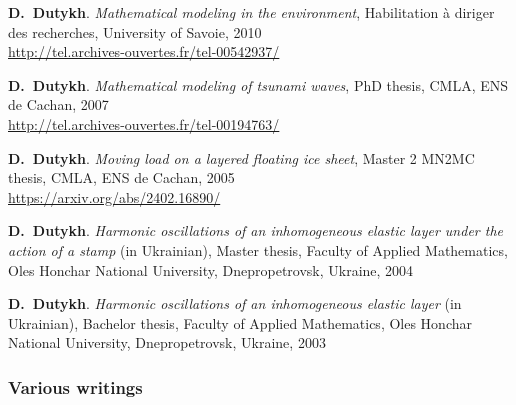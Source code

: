 \documentclass[final, a4paper, oneside, 12pt]{article}
\numberwithin{equation}{section}
\begin{document}
\begin{etaremune}
  
  \item \textbf{D.~Dutykh}. \textit{Mathematical modeling in the environment}, Habilitation \`a diriger des recherches, University of Savoie, 2010 \\ %
  \url{http://tel.archives-ouvertes.fr/tel-00542937/}
  
  \item \textbf{D.~Dutykh}. \textit{Mathematical modeling of tsunami waves}, PhD thesis, CMLA, ENS de Cachan, 2007 \\ %
  \url{http://tel.archives-ouvertes.fr/tel-00194763/}
  
  \item \textbf{D.~Dutykh}. \textit{Moving load on a layered floating ice sheet}, Master 2 MN2MC thesis, CMLA, ENS de Cachan, 2005 \\ %
  \url{https://arxiv.org/abs/2402.16890/}
  
  \item \textbf{D.~Dutykh}. \textit{Harmonic oscillations of an inhomogeneous elastic layer under the action of a stamp} (in Ukrainian), Master thesis, Faculty of Applied Mathematics, Oles Honchar National University, Dnepropetrovsk, Ukraine, 2004 %

  \item \textbf{D.~Dutykh}. \textit{Harmonic oscillations of an inhomogeneous elastic layer} (in Ukrainian), Bachelor thesis, Faculty of Applied Mathematics, Oles Honchar National University, Dnepropetrovsk, Ukraine, 2003 %
  
\end{etaremune}

\subsubsection{Various writings}
\end{document}

